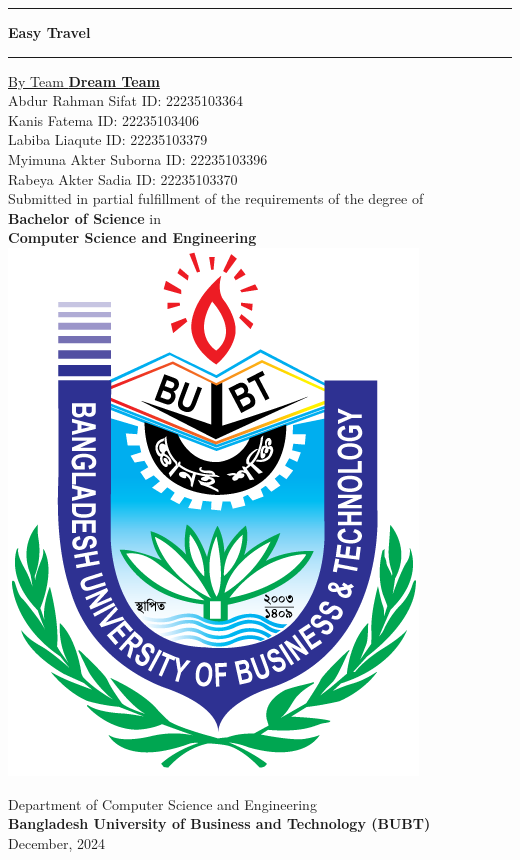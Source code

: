 
\begin{titlepage}
    \begin{center}
    \hrule
    \vspace{2mm}
     \large \textbf{Easy Travel}
    \vspace{2mm}
    \hrule 
    \vspace{20mm}
\underline{ By Team \textbf{Dream Team}}  \\
Abdur Rahman Sifat \hspace{16mm} ID: 22235103364 \\
Kanis Fatema \hspace{29mm} ID: 22235103406 \\
Labiba Liaqute \hspace{27mm} ID: 22235103379\\Myimuna Akter Suborna \hspace{10mm} ID: 22235103396   \\
Rabeya Akter Sadia \hspace{18mm} ID: 22235103370  \\
    \vspace{15mm}
    \large Submitted in partial fulfillment of the requirements of the degree of\\
\large  \textbf{Bachelor of Science} in\\
\large \textbf{Computer Science and Engineering}\\
\vspace{15mm}
\includegraphics[scale=0.2]{BUBT-Logo.png}

\large Department of Computer Science and Engineering\\
\large \huge\textbf{Bangladesh University of Business and Technology (BUBT)}\\
\vspace{10mm}
\large December, 2024
    
    \end{center}
\end{titlepage}